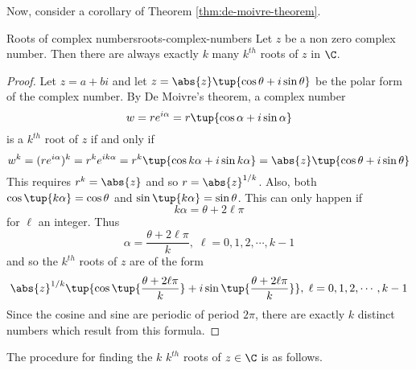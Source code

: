 Now, consider a corollary of Theorem \ref{thm:de-moivre-theorem}.

\begin{corollary}{Roots of complex numbers}{roots-complex-numbers}
Let $z$ be a non zero complex number.
Then there are always exactly $k$ many  $k^{th}$
roots of $z$ in $\C$.
\end{corollary}

\begin{proof}
Let $z=a+bi$ and let $z=\abs{z}\tup{\cos
\theta+i\sin \theta} $ be the polar form of the complex number. By De Moivre's
theorem, a complex number
\begin{equation*}
w= r e^{i \alpha} = r\tup{\cos \alpha +i\sin \alpha } 
\end{equation*}
is a $k^{th}$ root of $z$ if and only if
\begin{equation*}
w^k = (r e^{i \alpha})^k = r^k e^{ik\alpha} = r^{k}\tup{\cos k\alpha +i\sin k\alpha } =\abs{z}\tup{\cos \theta+i\sin \theta} 
\end{equation*}
This requires $r^{k}=\abs{z}$ and so $r=\abs{z}^{1/k}$. Also, both $\cos \tup{k\alpha } =\cos \theta$ and
$\sin \tup{k\alpha } =\sin \theta$. This can only happen if
\begin{equation*}
k\alpha =\theta+2 \ell \pi
\end{equation*}
for $\ell$ an integer. Thus
\begin{equation*}
\alpha =
\frac{\theta+2 \ell \pi }{k},\; \ell = 0, 1, 2, \cdots, k-1 
\end{equation*}
and so the $k^{th}$ roots of $z$ are of the form
\begin{equation*}
\abs{z}^{1/k}\tup{\cos \tup{\frac{\theta+2 \ell \pi }{k}}
+i\sin \tup{\frac{\theta+2 \ell \pi }{k}} } ,\;\ell = 0, 1, 2, \cdots, k-1 
\end{equation*}
Since the cosine and sine are periodic of period $2\pi$, there are exactly $
k$ distinct numbers which result from this formula. 
\end{proof}

The procedure for finding the $k$ $k^{th}$ roots of $z \in \C$ is as follows.

